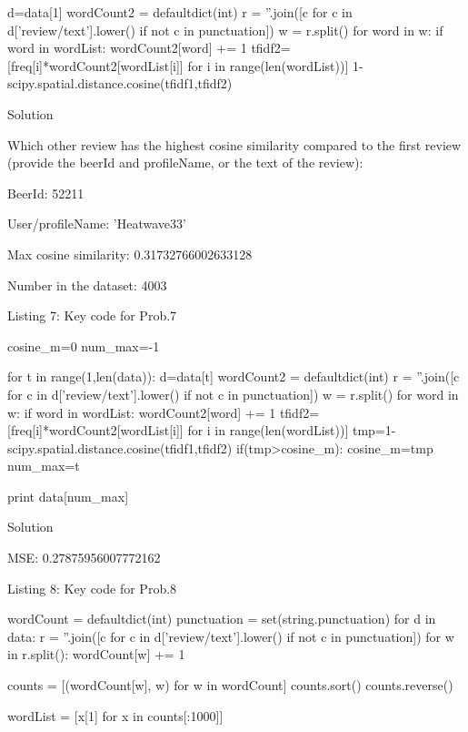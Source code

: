 \documentclass{assignment}
\begin{document}
\begin{problemlist}
\begin{python}
d=data[1]
wordCount2 = defaultdict(int)
r = ''.join([c for c in d['review/text'].lower() if not c in punctuation])
w = r.split()
for word in w:
    if word in wordList:
      wordCount2[word] += 1
tfidf2=[freq[i]*wordCount2[wordList[i]] for i in range(len(wordList))]
1-scipy.spatial.distance.cosine(tfidf1,tfidf2)
\end{python}

\pbitem Solution
\vspace{2ex}

Which other review has the highest cosine similarity compared to the ﬁrst review (provide the beerId and proﬁleName, or the text of the review):

BeerId: 52211

User/profileName: 'Heatwave33'

Max cosine similarity: 0.31732766002633128

Number in the dataset: 4003

\begin{center} 
Listing 7: Key code for Prob.7
\end{center}
\begin{python}
cosine_m=0
num_max=-1

for t in range(1,len(data)):
    d=data[t]
    wordCount2 = defaultdict(int)
    r = ''.join([c for c in d['review/text'].lower() if not c in punctuation])
    w = r.split()
    for word in w:
      if word in wordList:
        wordCount2[word] += 1
    tfidf2=[freq[i]*wordCount2[wordList[i]] for i in range(len(wordList))]
    tmp=1-scipy.spatial.distance.cosine(tfidf1,tfidf2)
    if(tmp>cosine_m):
      cosine_m=tmp
      num_max=t

print data[num_max]
\end{python}

\pbitem Solution
\vspace{2ex}

MSE: 0.27875956007772162

\begin{center} 
Listing 8: Key code for Prob.8
\end{center}
\begin{python}
wordCount = defaultdict(int)
punctuation = set(string.punctuation)
for d in data:
  r = ''.join([c for c in d['review/text'].lower() if not c in punctuation])
  for w in r.split():
    wordCount[w] += 1

counts = [(wordCount[w], w) for w in wordCount]
counts.sort()
counts.reverse()

wordList = [x[1] for x in counts[:1000]]


\end{python}
\end{problemlist}
\end{document}
